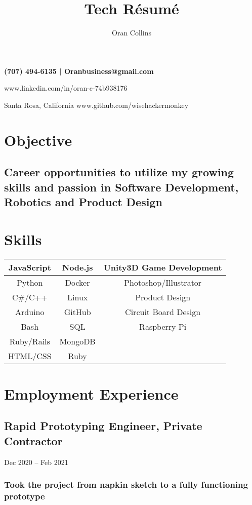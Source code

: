 \documentclass{article}
\makeatletter
\renewcommand{\maketitle}{
\begin{flushleft}
\bfseries
{\Huge\theauthor}\hfill
(707) 494-6135 |  Oranbusiness@gmail.com

\hfill www.linkedin.com/in/oran-c-74b938176

{\hspace{1mm}Santa Rosa, California}\hfill 
www.github.com/wisehackermonkey

\end{flushleft}
}
\makeatother
\begin{document}
\title{Tech R\'esum\'e}
\author{Oran Collins}


\maketitle
\section{Objective}
    \subsection{Career opportunities to utilize my growing skills and passion in Software Development, Robotics and Product Design}

\section{Skills}
\begin{flushleft}

    \begin{tabular}{ |c|c|c| }
        \hline
        JavaScript & Node.js & Unity3D Game Development\\\hline
        Python & Docker & Photoshop/Illustrator  \\ \hline
        C\#/C++ & Linux & Product Design \\ \hline
        Arduino & GitHub & Circuit Board Design \\ \hline
        Bash & SQL & Raspberry Pi \\ \hline
        Ruby/Rails & MongoDB &   \\ \hline
        HTML/CSS &  Ruby  &   \\ \hline
    \end{tabular}

\end{flushleft}

\section{Employment Experience}
     \subsection{Rapid Prototyping Engineer, Private Contractor} Dec 2020 – Feb 2021
        
        \vspace{-2mm}
    	\subsubsection{Took the project from napkin sketch to a fully functioning prototype}
\end{document}
